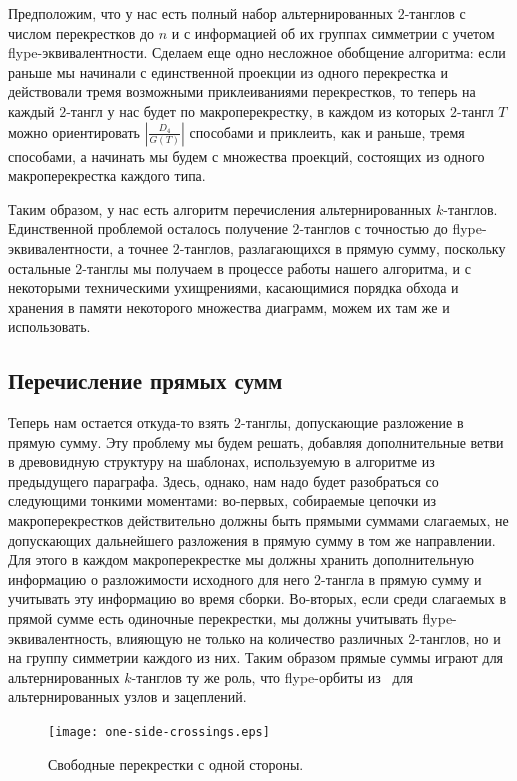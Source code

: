 \documentclass[12pt]{article}
\theoremstyle{plain}
\theoremstyle{definition}
\begin{document}
		Предположим, что у нас есть полный набор альтернированных $2$-танглов с числом перекрестков до $n$ и с информацией об их группах
		симметрии с учетом flype-эквивалентности. Сделаем еще одно несложное обобщение алгоритма: если раньше мы начинали с единственной
		проекции из одного перекрестка и действовали тремя возможными приклеиваниями перекрестков, то теперь на каждый $2$-тангл у нас
		будет по макроперекрестку, в каждом из которых $2$-тангл $T$ можно ориентировать $|\frac{D_4}{G(T)}|$ способами и приклеить,
		как и раньше, тремя способами, а начинать мы будем с множества проекций, состоящих из одного макроперекрестка каждого типа.

		Таким образом, у нас есть алгоритм перечисления альтернированных $k$-танглов. Единственной проблемой осталось получение $2$-танглов
		с точностью до flype-эквивалентности, а точнее $2$-танглов, разлагающихся в прямую сумму, поскольку остальные $2$-танглы мы
		получаем в процессе работы нашего алгоритма, и с некоторыми техническими ухищрениями, касающимися порядка обхода и хранения в памяти
		некоторого множества диаграмм, можем их там же и использовать.

	\subsection{Перечисление прямых сумм}

		Теперь нам остается откуда-то взять $2$-танглы, допускающие разложение в прямую сумму. Эту проблему мы будем решать, добавляя
		дополнительные ветви в древовидную структуру на шаблонах, используемую в алгоритме из предыдущего параграфа. Здесь, однако,
		нам надо будет разобраться со следующими тонкими моментами: во-первых, собираемые цепочки из макроперекрестков действительно
		должны быть прямыми суммами слагаемых, не допускающих дальнейшего разложения в прямую сумму в том же направлении. Для этого в
		каждом макроперекрестке мы должны хранить дополнительную информацию о разложимости исходного для него $2$-тангла в прямую
		сумму и учитывать эту информацию во время сборки. Во-вторых, если среди слагаемых в прямой сумме есть одиночные перекрестки,
		мы должны учитывать flype-эквивалентность, влияющую не только на количество различных $2$-танглов, но и на группу симметрии
		каждого из них. Таким образом прямые суммы играют для альтернированных $k$-танглов ту же роль, что flype-орбиты
		из~\cite{RankinSchermannSmith2002_1, RankinSchermannSmith2002_2, RankinSmith2002} для альтернированных узлов и зацеплений.

		\begin{figure}[ht]
			\centering
			\texttt{[image: one-side-crossings.eps]}
			\caption{\footnotesize Свободные перекрестки с одной стороны.\label{figure:one-side-crossings}}
		\end{figure}
\end{document}
